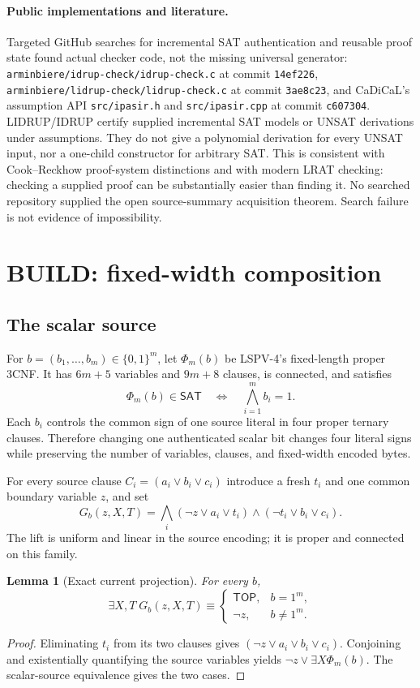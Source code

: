 \documentclass[11pt]{article}
\newtheorem{lemma}[theorem]{Lemma}
\newcommand{\TOP}{\mathsf{TOP}}
\begin{document}
\paragraph{Public implementations and literature.}
Targeted GitHub searches for incremental SAT authentication and reusable proof state found actual checker code, not the missing universal generator: \texttt{arminbiere/idrup-check/idrup-check.c} at commit \texttt{14ef226}, \texttt{arminbiere/lidrup-check/lidrup-check.c} at commit \texttt{3ae8c23}, and CaDiCaL's assumption API \texttt{src/ipasir.h} and \texttt{src/ipasir.cpp} at commit \texttt{c607304}.  LIDRUP/IDRUP certify supplied incremental SAT models or UNSAT derivations under assumptions.  They do not give a polynomial derivation for every UNSAT input, nor a one-child constructor for arbitrary SAT.  This is consistent with Cook--Reckhow proof-system distinctions and with modern LRAT checking: checking a supplied proof can be substantially easier than finding it.  No searched repository supplied the open source-summary acquisition theorem.  Search failure is not evidence of impossibility.

\section{BUILD: fixed-width composition}
\subsection{The scalar source}
For $b=(b_1,\ldots,b_m)\in\{0,1\}^m$, let $\Phi_m(b)$ be LSPV-4's fixed-length proper 3CNF.  It has $6m+5$ variables and $9m+8$ clauses, is connected, and satisfies
\[
 \Phi_m(b)\in\mathsf{SAT}\quad\Longleftrightarrow\quad \bigwedge_{i=1}^m b_i=1.
\]
Each $b_i$ controls the common sign of one source literal in four proper ternary clauses.  Therefore changing one authenticated scalar bit changes four literal signs while preserving the number of variables, clauses, and fixed-width encoded bytes.

For every source clause $C_i=(a_i\vee b_i\vee c_i)$ introduce a fresh $t_i$ and one common boundary variable $z$, and set
\[
 G_b(z,X,T)=\bigwedge_i
  (\neg z\vee a_i\vee t_i)\wedge(\neg t_i\vee b_i\vee c_i).
\]
The lift is uniform and linear in the source encoding; it is proper and connected on this family.

\begin{lemma}[Exact current projection]
For every $b$,
\[
 \exists X,T\;G_b(z,X,T)\equiv
 \begin{cases}
 \TOP,&b=1^m,\\
 \neg z,&b\ne1^m.
 \end{cases}
\]
\end{lemma}
\begin{proof}
Eliminating $t_i$ from its two clauses gives
$(\neg z\vee a_i\vee b_i\vee c_i)$.  Conjoining and existentially quantifying the source variables yields $\neg z\vee\exists X\Phi_m(b)$.  The scalar-source equivalence gives the two cases.
\end{proof}
\end{document}
